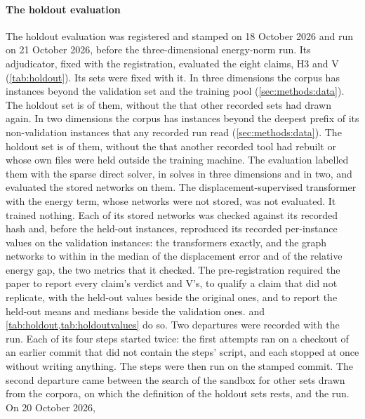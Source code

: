 

\paragraph{The holdout evaluation}
The holdout evaluation was registered and stamped on 18 October 2026 and run on 21 October
2026, before the three-dimensional energy-norm run. Its adjudicator, fixed with the registration, evaluated the eight claims, H3 and V (\cref{tab:holdout}). Its sets were fixed with
it. In three dimensions the corpus has \numHoldThreeTail{} instances beyond the validation set and the training pool (\cref{sec:methods:data}). The holdout set is \numHoldThreeN{} of
them, without the \numHoldThreeExcl{} that other recorded sets had drawn again. In two
dimensions the corpus has \numHoldTwoTail{} instances beyond the deepest prefix of its
non-validation instances that any recorded run read (\cref{sec:methods:data}). The holdout set is \numHoldTwoN{} of them, without
the \numHoldTwoExcl{} that another recorded tool had rebuilt or whose own files were held
outside the training machine. The evaluation labelled them with the sparse direct solver, in
\numHoldThreeSolves{} solves in three dimensions and \numHoldTwoSolves{} in two, and evaluated the stored networks on them. The displacement-supervised transformer with the
energy term, whose networks were not stored, was not evaluated. It trained nothing. Each of its \numHoldStates{} stored networks was checked against its
recorded hash and, before the held-out instances, reproduced its recorded per-instance values
on the validation instances: the transformers exactly, and the graph networks to within \numHoldContentDev{} in the median
of the displacement error and of the relative energy gap, the two metrics that it checked.
The pre-registration required the paper to report every claim's verdict and V's, to qualify
a claim that did not replicate, with the held-out values beside the original ones, and to report the held-out means and medians beside the validation ones.
 and \cref{tab:holdout,tab:holdoutvalues} do so. Two
departures were recorded with the run. Each of its four steps started twice: the first
attempts ran on a checkout of an earlier commit that did not contain the steps' script, and each stopped at once without writing anything. The steps were then run on the stamped
commit. The second departure came between the search of the sandbox for other sets drawn from the
corpora, on which the definition of the holdout sets rests, and the run. On 20 October 2026,
